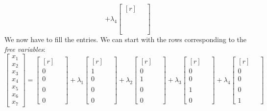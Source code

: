 \documentclass[12pt]{article}
\begin{document}
\begin{enumerate}
\[+\lambda_4\begin{bmatrix*}[r] \quad \\ \\ \\ \\ \\ \\ \\ \end{bmatrix*}
\]
We now have to fill the entries. We can start with the rows corresponding to the \emph{free variables}:
\[
\begin{bmatrix}x_1\\x_2\\x_3\\x_4\\x_5\\x_6\\x_7\end{bmatrix}
=
\begin{bmatrix*}[r]           \quad \\ 0\\ 0\\ \\ 0\\ \\ 0\end{bmatrix*}
+\lambda_1\begin{bmatrix*}[r] \quad \\ 1\\ 0\\ \\ 0\\ \\ 0\end{bmatrix*}
+\lambda_2\begin{bmatrix*}[r] \quad \\ 0\\ 1\\ \\ 0\\ \\ 0\end{bmatrix*}
+\lambda_3\begin{bmatrix*}[r] \quad \\ 0\\ 0\\ \\ 1\\ \\ 0\end{bmatrix*}
+\lambda_4\begin{bmatrix*}[r] \quad \\ 0\\ 0\\ \\ 0\\ \\ 1\end{bmatrix*}
\]
\end{enumerate}
\end{document}
